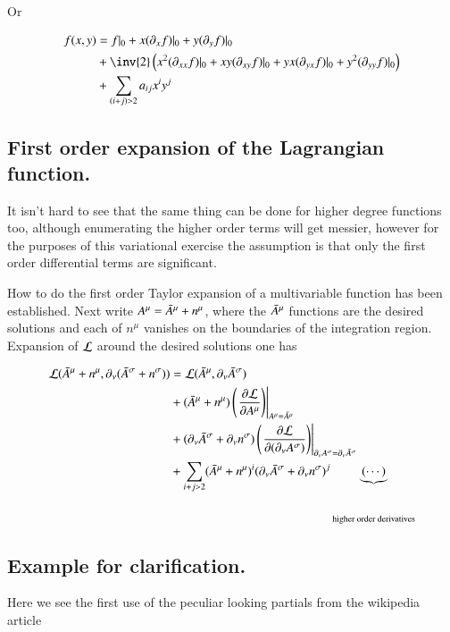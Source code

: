 Or

\begin{align*}
f(x,y) &= f \vert_0 + x (\partial_x f) \vert_0 + y (\partial_y f) \vert_0 \\
&+ \inv{2} \left( x^2 (\partial_{x x} f) \vert_0 + x y (\partial_{x y} f) \vert_0  + y x (\partial_{y x} f) \vert_0  + y^2(\partial_{y y} f) \vert_0 \right) \\
&+ \sum_{(i+j) > 2} a_{i j} x^i y^j
\end{align*}

\subsection{First order expansion of the Lagrangian function. }

It isn't hard to see that the same thing can be done for higher degree functions too, although enumerating the 
higher order terms will get messier, however for the purposes of this variational exercise the assumption is that only
the first order differential terms are significant.

How to do the first order Taylor expansion of a multivariable function has been established.  Next write $A^\mu = \bar{A}^\mu + n^\mu$, where the $\bar{A}^\mu$ functions are the desired solutions and each of $n^\mu$ vanishes on the boundaries of the integration region.  Expansion of $\mathcal{L}$ around the desired solutions one has

\begin{align*}
\mathcal{L}(\bar{A}^\mu + n^\mu, \partial_\nu( \bar{A}^\sigma + n^\sigma) )
&=
\mathcal{L}(\bar{A}^\mu, \partial_\nu \bar{A}^\sigma ) \\
&+ (\bar{A}^\mu + n^\mu) \left( \left. \frac{\partial {\mathcal{L}}}{\partial {A^\mu}} \right) \right\vert_{A^\mu = \bar{A}^\mu} \\
&+ (\partial_\nu \bar{A}^\sigma + \partial_\nu n^\sigma) \left( \left. \frac{\partial {\mathcal{L}}}{\partial {(\partial_\nu A^\sigma)}} \right) \right\vert_{\partial_\nu A^\sigma = \partial_\nu \bar{A}^\sigma} \\
&+ \sum_{i+j>2} (\bar{A}^\mu + n^\mu)^i (\partial_\nu \bar{A}^\sigma + \partial_\nu n^\sigma)^j \underbrace{\left(\cdots\right)}_{\text{higher order derivatives}}
\end{align*}

\subsection{Example for clarification. }
Here we see the first use of the peculiar looking partials from the wikipedia article


